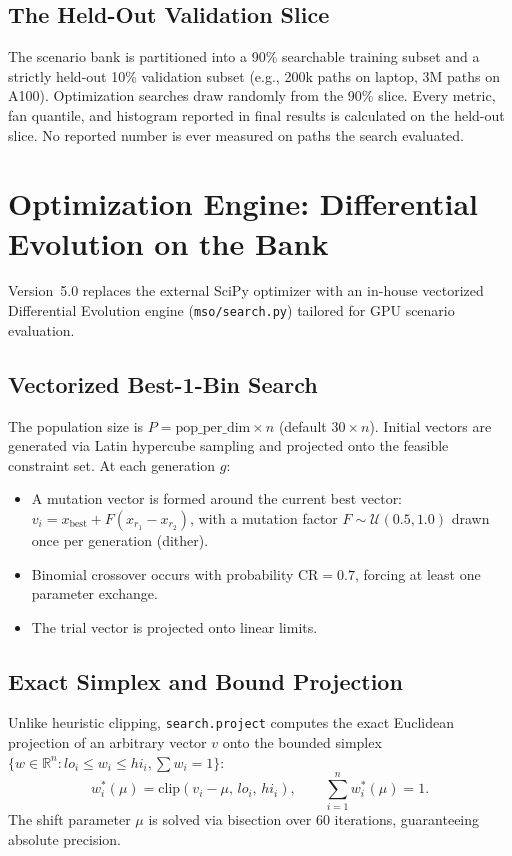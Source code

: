 \documentclass[11pt]{article}
\begin{document}
\subsection{The Held-Out Validation Slice}
The scenario bank is partitioned into a 90\% searchable training subset and a strictly held-out 10\% validation
subset (e.g., 200k paths on laptop, 3M paths on A100). Optimization searches draw randomly from the 90\% slice.
Every metric, fan quantile, and histogram reported in final results is calculated on the held-out slice.
No reported number is ever measured on paths the search evaluated.

\section{Optimization Engine: Differential Evolution on the Bank}
Version~5.0 replaces the external SciPy optimizer with an in-house vectorized Differential Evolution engine
(\texttt{mso/search.py}) tailored for GPU scenario evaluation.

\subsection{Vectorized Best-1-Bin Search}
The population size is $P = \mathrm{pop\_per\_dim} \times n$ (default $30 \times n$). Initial vectors are
generated via Latin hypercube sampling and projected onto the feasible constraint set. At each generation $g$:
\begin{itemize}[nosep]
\item A mutation vector is formed around the current best vector: $v_i = x_{\mathrm{best}} + F (x_{r_1} - x_{r_2})$,
with a mutation factor $F \sim \mathcal{U}(0.5, 1.0)$ drawn once per generation (dither).
\item Binomial crossover occurs with probability $\mathrm{CR} = 0.7$, forcing at least one parameter exchange.
\item The trial vector is projected onto linear limits.
\end{itemize}

\subsection{Exact Simplex and Bound Projection}
Unlike heuristic clipping, \texttt{search.project} computes the exact Euclidean projection of an arbitrary
vector $v$ onto the bounded simplex $\{w \in \mathbb{R}^n : lo_i \le w_i \le hi_i, \sum w_i = 1\}$:
\begin{equation}
w_i^*(\mu) = \mathrm{clip}(v_i - \mu,\, lo_i,\, hi_i), \qquad \sum_{i=1}^n w_i^*(\mu) = 1.
\end{equation}
The shift parameter $\mu$ is solved via bisection over 60 iterations, guaranteeing absolute precision.
\end{document}
